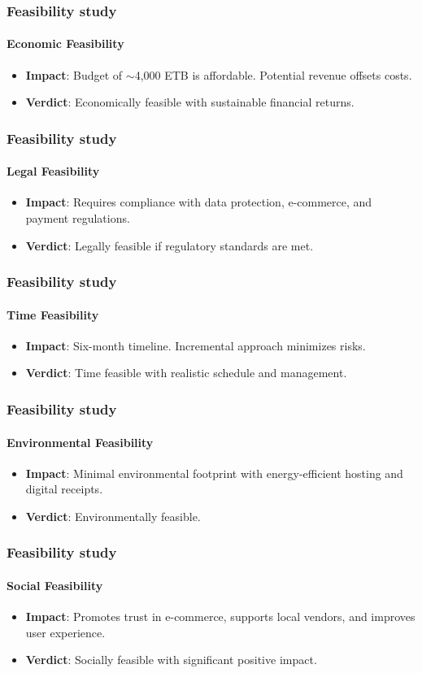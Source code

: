 \documentclass{beamer}
\begin{document}
\begin{frame}
	\frametitle{Feasibility study}
	\framesubtitle{Economic Feasibility}
	\begin{itemize}
		\item \textbf{Impact}: Budget of $\sim$4,000 ETB is affordable. Potential revenue offsets costs.
		\item \textbf{Verdict}: Economically feasible with sustainable financial returns.
	\end{itemize}
\end{frame}

\begin{frame}
	\frametitle{Feasibility study}
	\framesubtitle{Legal Feasibility }
	\begin{itemize}
		\item\textbf{Impact}: Requires compliance with data protection, e-commerce, and payment regulations.
		\item\textbf{Verdict}: Legally feasible if regulatory standards are met.
	\end{itemize}
\end{frame}

\begin{frame}
	\frametitle{Feasibility study}
	\framesubtitle{Time Feasibility}
	\begin{itemize}
		\item\textbf{Impact}: Six-month timeline. Incremental approach minimizes risks.
		\item\textbf{Verdict}: Time feasible with realistic schedule and management.
	\end{itemize}
\end{frame}

\begin{frame}
	\frametitle{Feasibility study}
	\framesubtitle{Environmental Feasibility}
	\begin{itemize}
		\item\textbf{Impact}: Minimal environmental footprint with energy-efficient hosting and digital receipts.
		\item\textbf{Verdict}: Environmentally feasible.
	\end{itemize}
\end{frame}

\begin{frame}
	\frametitle{Feasibility study}
	\framesubtitle{Social Feasibility}
	\begin{itemize}
		\item\textbf{Impact}: Promotes trust in e-commerce, supports local vendors, and improves user experience.
		\item\textbf{Verdict}: Socially feasible with significant positive impact.
	\end{itemize}
\end{frame}
\end{document}
